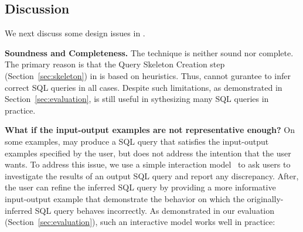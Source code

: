







\subsection{Discussion}
\label{sec:uim}

We next discuss some design issues in \ourtool.

\noindent \textbf{Soundness and Completeness.} The \ourtool
technique is neither sound nor complete. The primary
reason is that the Query Skeleton Creation step (Section~\ref{sec:skeleton})
in \ourtool is based on heuristics.
Thus, \ourtool cannot gurantee to infer correct SQL queries
in all cases. Despite such limitations,
as demonstrated in Section~\ref{sec:evaluation}, \ourtool
is still useful in sythesizing many SQL queries in practice.

\vspace{1mm}
\noindent \textbf{What if the input-output examples are not
representative enough?}
On some examples, \ourtool may produce a SQL query that
satisfies the input-output examples specified by the user,
but does not address the intention that the user wants.
To address this issue, we use a simple
interaction model~\cite{Harris:2011} to ask users to
investigate the results of an output SQL query and report any discrepancy.
After, the user can refine the inferred SQL query by providing a more
informative input-output example that demonstrate the behavior on
which the originally-inferred SQL query behaves incorrectly.
As demonstrated in our evaluation (Section~\ref{sec:evaluation}),
such an interactive model works well in practice: 




